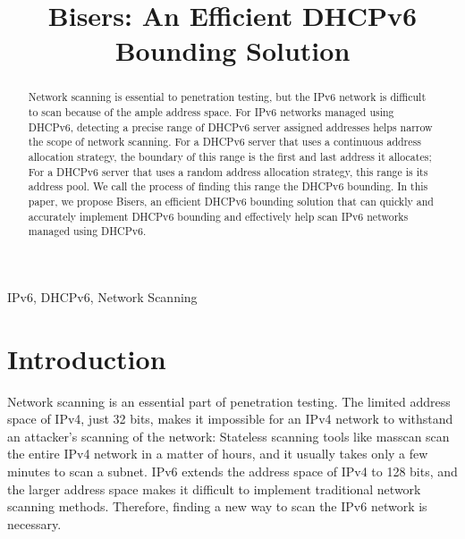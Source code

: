 \documentclass[conference]{IEEEtran}
\begin{document}
\title{Bisers: An Efficient DHCPv6 Bounding Solution}

\author{
  \and
}

\maketitle

\begin{abstract}
  Network scanning is essential to penetration testing, but the IPv6
  network is difficult to scan because of the ample address space. For
  IPv6 networks managed using DHCPv6, detecting a precise range of
  DHCPv6 server assigned addresses helps narrow the scope of network
  scanning. For a DHCPv6 server that uses a continuous address
  allocation strategy, the boundary of this range is the first and
  last address it allocates; For a DHCPv6 server that uses a random
  address allocation strategy, this range is its address pool. We call
  the process of finding this range the DHCPv6 bounding. In this
  paper, we propose Bisers, an efficient DHCPv6 bounding solution that
  can quickly and accurately implement DHCPv6 bounding and effectively
  help scan IPv6 networks managed using DHCPv6.
\end{abstract}

\begin{IEEEkeywords}
  IPv6, DHCPv6, Network Scanning
\end{IEEEkeywords}

\section{Introduction}

Network scanning is an essential part of penetration testing. The
limited address space of IPv4, just 32 bits, makes it impossible for
an IPv4 network to withstand an attacker's scanning of the network:
Stateless scanning tools like masscan scan the entire IPv4 network in
a matter of hours, and it usually takes only a few minutes to scan a
subnet. IPv6 extends the address space of IPv4 to 128 bits, and the
larger address space makes it difficult to implement traditional
network scanning methods. Therefore, finding a new way to scan the
IPv6 network is necessary.
\end{document}
